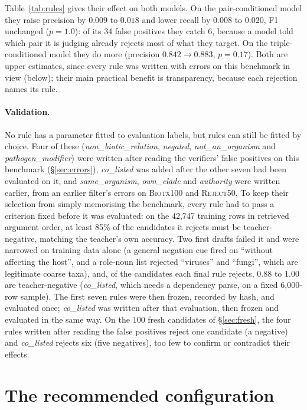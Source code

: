 \documentclass[11pt]{article}
\begin{document}
Table~\ref{tab:rules} gives their effect on both models. On the pair-conditioned model they raise
precision by $0.009$ to $0.018$ and lower recall by $0.008$ to $0.020$, F1 unchanged ($p = 1.0$): of its 34
false positives they catch 6, because a model told which pair it is judging already rejects most of
what they target. On the triple-conditioned model they do more (precision $0.842 \to 0.883$,
$p = 0.17$). Both are upper estimates, since every rule was written with errors on this benchmark
in view (below); their main practical benefit is transparency, because each rejection names its
rule.

\paragraph{Validation.}
No rule has a parameter fitted to evaluation labels, but rules can still be fitted by choice.
Four of these (\emph{non\_biotic\_relation}, \emph{negated}, \emph{not\_an\_organism} and
\emph{pathogen\_modifier}) were written after reading the verifiers' false positives on this
benchmark (\S\ref{sec:errors}), \emph{co\_listed} was added after the other seven had been evaluated
on it, and \emph{same\_organism}, \emph{own\_clade} and \emph{authority} were written earlier, from an
earlier filter's errors on \textsc{Biotx100} and \textsc{Reject50}. To
keep their selection from simply memorising the benchmark, every rule had to pass a criterion fixed
before it was evaluated: on the 42{,}747 training rows in retrieved argument order, at least 85\% of
the candidates it rejects must be teacher-negative, matching the teacher's own accuracy. Two first drafts failed it and were
narrowed on training data alone (a general negation cue fired on ``without affecting the host'', and
a role-noun list rejected ``viruses'' and ``fungi'', which are legitimate coarse taxa), and, of the
candidates each final rule rejects, $0.88$ to $1.00$ are teacher-negative (\emph{co\_listed}, which
needs a dependency parse, on a fixed 6{,}000-row sample). The first seven rules were then frozen,
recorded by hash, and evaluated once; \emph{co\_listed} was written after that evaluation, then frozen
and evaluated in the same way. On the 100 fresh candidates of \S\ref{sec:fresh}, the four rules
written after reading the false positives reject one candidate (a negative) and \emph{co\_listed}
rejects six (five negatives), too few to confirm or contradict their effects.

\section{The recommended configuration}
\label{app:deploy}
\end{document}
